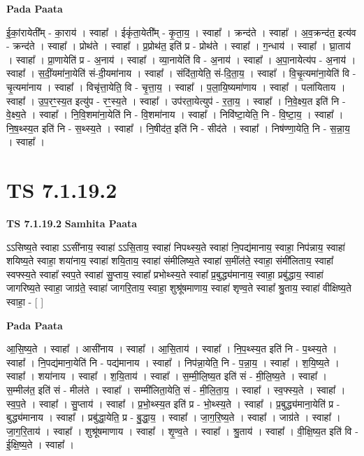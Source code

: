 \documentclass[17pt]{extarticle}
\begin{document}
\textbf{Pada Paata} \newline

ई॒कां॒रायेती᳚म् - का॒राय॑ । स्वाहा᳚ । ईकृं॑ता॒येती᳚म् - कृ॒ता॒य॒ । स्वाहा᳚ । क्रन्द॑ते । स्वाहा᳚ । अ॒व॒क्रन्द॑त॒ इत्य॑व - क्रन्द॑ते । स्वाहा᳚ । प्रोथ॑ते । स्वाहा᳚ । प्र॒प्रोथ॑त॒ इति॑ प्र - प्रोथ॑ते । स्वाहा᳚ । ग॒न्धाय॑ । स्वाहा᳚ । घ्रा॒ताय॑ । स्वाहा᳚ । प्रा॒णायेति॑ प्र - अ॒नाय॑ । स्वाहा᳚ । व्या॒नायेति॑ वि - अ॒नाय॑ । स्वाहा᳚ । अ॒पा॒नायेत्य॑प - अ॒नाय॑ । स्वाहा᳚ । स॒दीं॒यमा॑ना॒येति॑ सं-दी॒यमा॑नाय । स्वाहा᳚ । संदि॑ता॒येति॒ सं-दि॒ता॒य॒ । स्वाहा᳚ । वि॒चृ॒त्यमा॑ना॒येति॑ वि - चृ॒त्यमा॑नाय । स्वाहा᳚ । विचृ॑त्ता॒येति॒ वि - चृ॒त्ता॒य॒ । स्वाहा᳚ । प॒ला॒यि॒ष्यमा॑णाय । स्वाहा᳚ । पला॑यिताय । स्वाहा᳚ । उ॒प॒रꣳ॒॒स्य॒त इत्यु॑प - रꣳ॒॒स्य॒ते । स्वाहा᳚ । उप॑रता॒येत्युप॑ - र॒ता॒य॒ । स्वाहा᳚ । नि॒वे॒क्ष्य॒त इति॑ नि - वे॒क्ष्य॒ते । स्वाहा᳚ । नि॒वि॒शमा॑ना॒येति॑ नि - वि॒शमा॑नाय । स्वाहा᳚ । निवि॑ष्टा॒येति॒ नि - वि॒ष्टा॒य॒ । स्वाहा᳚ । नि॒ष॒थ्स्य॒त इति॑ नि - स॒थ्स्य॒ते । स्वाहा᳚ । नि॒षीद॑त॒ इति॑ नि - सीद॑ते । स्वाहा᳚ । निष॑ण्णा॒येति॒ नि - स॒न्ना॒य॒ । स्वाहा᳚ ।  \newline





\section{ TS 7.1.19.2 }

\textbf{TS 7.1.19.2 } \newline
\textbf{Samhita Paata} \newline

ऽऽसिष्य॒ते स्वाहा ऽऽसी॑नाय॒ स्वाहा॑ ऽऽसि॒ताय॒ स्वाहा॑ निपथ्स्य॒ते स्वाहा॑ नि॒पद्य॑मानाय॒ स्वाहा॒ निप॑न्नाय॒ स्वाहा॑ शयिष्य॒ते स्वाहा॒ शया॑नाय॒ स्वाहा॑ शयि॒ताय॒ स्वाहा॑ संमीलिष्य॒ते स्वाहा॑ स॒मींल॑ते॒ स्वाहा॒ संमी॑लिताय॒ स्वाहा᳚ स्वफ्स्य॒ते स्वाहा᳚ स्वप॒ते स्वाहा॑ सु॒प्ताय॒ स्वाहा᳚ प्रभोथ्स्य॒ते स्वाहा᳚ प्र॒बुद्ध्य॑मानाय॒ स्वाहा॒ प्रबु॑द्धाय॒ स्वाहा॑ जागरिष्य॒ते स्वाहा॒ जाग्र॑ते॒ स्वाहा॑ जागरि॒ताय॒ स्वाहा॒ शुश्रू॑षमाणाय॒ स्वाहा॑ शृण्व॒ते स्वाहा᳚ श्रु॒ताय॒ स्वाहा॑ वीक्षिष्य॒ते स्वाहा॒ - [  ] \newline

\textbf{Pada Paata} \newline

आ॒सि॒ष्य॒ते । स्वाहा᳚ । आसी॑नाय । स्वाहा᳚ । आ॒सि॒ताय॑ । स्वाहा᳚ । नि॒प॒थ्स्य॒त इति॑ नि - प॒थ्स्य॒ते । स्वाहा᳚ । नि॒पद्य॑माना॒येति॑ नि - पद्य॑मानाय । स्वाहा᳚ । निप॑न्ना॒येति॒ नि - प॒न्ना॒य॒ । स्वाहा᳚ । श॒यि॒ष्य॒ते । स्वाहा᳚ । शया॑नाय । स्वाहा᳚ । श॒यि॒ताय॑ । स्वाहा᳚ । स॒म्मी॒लि॒ष्य॒त इति॑ सं - मी॒लि॒ष्य॒ते । स्वाहा᳚ । स॒म्मील॑त॒ इति॑ सं - मील॑ते । स्वाहा᳚ । सम्मी॑लिता॒येति॒ सं - मी॒लि॒ता॒य॒ । स्वाहा᳚ । स्व॒फ्स्य॒ते । स्वाहा᳚ । स्व॒प॒ते । स्वाहा᳚ । सु॒प्ताय॑ । स्वाहा᳚ । प्र॒भो॒थ्स्य॒त इति॑ प्र - भो॒थ्स्य॒ते । स्वाहा᳚ । प्र॒बुद्ध्य॑माना॒येति॑ प्र - बुद्ध्य॑मानाय । स्वाहा᳚ । प्रबु॑द्धा॒येति॒ प्र - बु॒द्धा॒य॒ । स्वाहा᳚ । जा॒ग॒रि॒ष्य॒ते । स्वाहा᳚ । जाग्र॑ते । स्वाहा᳚ । जा॒ग॒रि॒ताय॑ । स्वाहा᳚ । शुश्रू॑षमाणाय । स्वाहा᳚ । शृ॒ण्व॒ते । स्वाहा᳚ । श्रु॒ताय॑ । स्वाहा᳚ । वी॒क्षि॒ष्य॒त इति॑ वि - ई॒क्षि॒ष्य॒ते । स्वाहा᳚ ।  \newline
\end{document}
